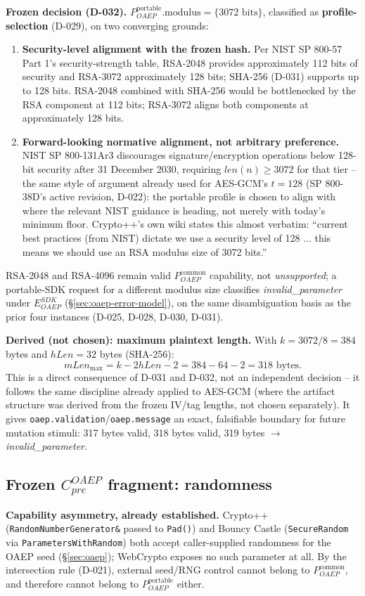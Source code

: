 \documentclass[11pt,a4paper]{article}
\begin{document}
\textbf{Frozen decision (D-032).} $P_{OAEP}^{\text{portable}}.\text{modulus} = \{3072 \text{ bits}\}$, classified as \textbf{profile-selection} (D-029), on two converging grounds:
\begin{enumerate}
\item \textbf{Security-level alignment with the frozen hash.} Per NIST SP 800-57 Part 1's security-strength table, RSA-2048 provides approximately 112 bits of security and RSA-3072 approximately 128 bits; SHA-256 (D-031) supports up to 128 bits. RSA-2048 combined with SHA-256 would be bottlenecked by the RSA component at 112 bits; RSA-3072 aligns both components at approximately 128 bits.
\item \textbf{Forward-looking normative alignment, not arbitrary preference.} NIST SP 800-131Ar3 discourages signature/encryption operations below 128-bit security after 31 December 2030, requiring $len(n) \ge 3072$ for that tier -- the same style of argument already used for AES-GCM's $t=128$ (SP 800-38D's active revision, D-022): the portable profile is chosen to align with where the relevant NIST guidance is heading, not merely with today's minimum floor. Crypto++'s own wiki states this almost verbatim: ``current best practices (from NIST) dictate we use a security level of 128 ... this means we should use an RSA modulus size of 3072 bits.''
\end{enumerate}
RSA-2048 and RSA-4096 remain valid $P_{OAEP}^{\text{common}}$ capability, not \emph{unsupported}; a portable-SDK request for a different modulus size classifies \emph{invalid\_parameter} under $E_{OAEP}^{SDK}$ (\S\ref{sec:oaep-error-model}), on the same disambiguation basis as the prior four instances (D-025, D-028, D-030, D-031).

\textbf{Derived (not chosen): maximum plaintext length.} With $k = 3072/8 = 384$ bytes and $hLen = 32$ bytes (SHA-256):
\[mLen_{\max} = k - 2hLen - 2 = 384 - 64 - 2 = 318 \text{ bytes.}\]
This is a direct consequence of D-031 and D-032, not an independent decision -- it follows the same discipline already applied to AES-GCM (where the artifact structure was derived from the frozen IV/tag lengths, not chosen separately). It gives \texttt{oaep.validation}/\texttt{oaep.message} an exact, falsifiable boundary for future mutation stimuli: 317 bytes valid, 318 bytes valid, 319 bytes $\to$ \emph{invalid\_parameter}.

\subsection{Frozen $C_{pre}^{OAEP}$ fragment: randomness}\label{sec:oaep-randomness}
\textbf{Capability asymmetry, already established.} Crypto++ (\texttt{RandomNumberGenerator\&} passed to \texttt{Pad()}) and Bouncy Castle (\texttt{SecureRandom} via \texttt{ParametersWithRandom}) both accept caller-supplied randomness for the OAEP seed (\S\ref{sec:oaep}); WebCrypto exposes no such parameter at all. By the intersection rule (D-021), external seed/RNG control cannot belong to $P_{OAEP}^{\text{common}}$, and therefore cannot belong to $P_{OAEP}^{\text{portable}}$ either.
\end{document}
